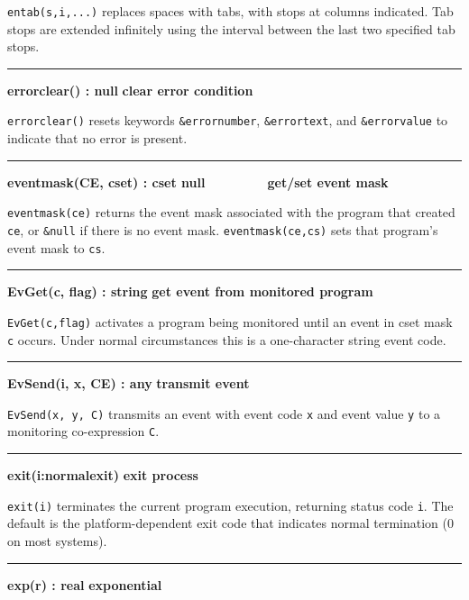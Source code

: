 \noindent
\texttt{entab(s,i,...)} replaces spaces with tabs, with stops at columns
indicated. Tab stops are extended infinitely using the interval between
the last two specified tab stops.

\bigskip\hrule\vspace{0.1cm}
\noindent
{\bf errorclear() : null } \hfill {\bf clear error condition}

\noindent
{}\texttt{errorclear()} resets keywords
\texttt{\&errornumber}, \texttt{\&errortext}, and
\texttt{\&errorvalue} to indicate that no error is present.

\bigskip\hrule\vspace{0.1cm}
\noindent
{\bf eventmask(CE, cset) : cset {\textbar} null } \hfill {\bf \ \ \ \ \ \ \ \  get/set event mask}

\noindent
{}\texttt{eventmask(ce)} returns the event mask associated
with the program that created \texttt{ce}, or \texttt{\&null} if there
is no event mask. \texttt{eventmask(ce,cs)} sets that program's event
mask to \texttt{cs}.

\bigskip\hrule\vspace{0.1cm}
\noindent
{\bf EvGet(c, flag) : string } \hfill {\bf get event from monitored program}

\noindent
\texttt{EvGet(c,flag)} activates a program being monitored until an event
in cset mask \texttt{c} occurs. Under normal circumstances this is a
one-character string event code.

\bigskip\hrule\vspace{0.1cm}
\noindent
{\bf EvSend(i, x, CE) : any } \hfill {\bf transmit event}

\noindent
{}\texttt{EvSend(x, y, C)} transmits an event with event
code \texttt{x} and event value \texttt{y} to a monitoring
co-expression \texttt{C}.

\bigskip\hrule\vspace{0.1cm}
\noindent
{\bf exit(i:normalexit) } \hfill {\bf exit process}

\noindent
{}\texttt{exit(i)} terminates the current program execution,
returning status code \texttt{i}. The default is the platform-dependent exit
code that indicates normal termination (0 on most systems).

\bigskip\hrule\vspace{0.1cm}
\noindent
{\bf exp(r) : real } \hfill {\bf exponential}

